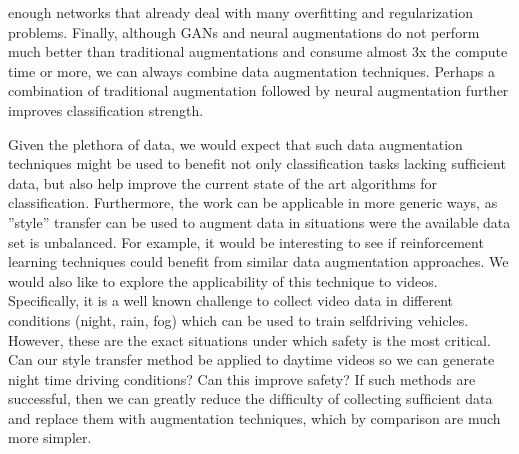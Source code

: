 \documentclass[a4paper,11pt]{article}
\begin{document}
enough networks that already deal with many overﬁtting and regularization problems. Finally, although GANs and neural augmentations do not perform much better than traditional augmentations and consume almost 3x the compute time or more, we can always combine data augmentation techniques. Perhaps a combination of traditional augmentation followed by neural augmentation further improves classiﬁcation strength.

Given the plethora of data, we would expect that such data augmentation techniques might be used to beneﬁt not only classiﬁcation tasks lacking sufﬁcient data, but also help improve the current state of the art algorithms for classiﬁcation. Furthermore, the work can be applicable in more generic ways, as ”style” transfer can be used to augment data in situations were the available data set is unbalanced. For example, it would be interesting to see if reinforcement learning techniques could beneﬁt from similar data augmentation approaches. We would also like to explore the applicability of this technique to videos. Speciﬁcally, it is a well known challenge to collect video data in different conditions (night, rain, fog) which can be used to train selfdriving vehicles. However, these are the exact situations under which safety is the most critical. Can our style transfer method be applied to daytime videos so we can generate night time driving conditions? Can this improve safety? If such methods are successful, then we can greatly reduce the difﬁculty of collecting sufﬁcient data and replace them with augmentation techniques, which by comparison are much more simpler.




\end{document}
